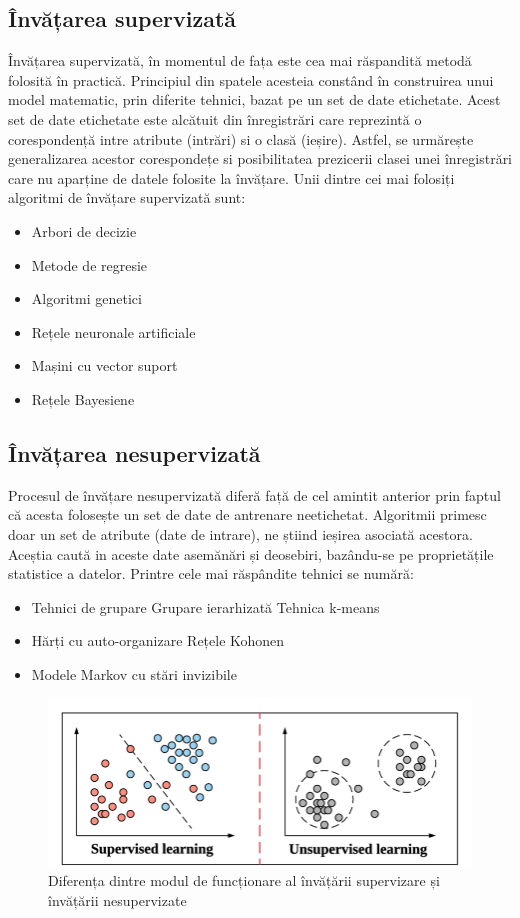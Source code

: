 \subsection*{Învățarea supervizată}
Învățarea supervizată, în momentul de fața este cea mai răspandită metodă folosită în practică. Principiul din spatele acesteia constând în construirea unui model matematic, prin diferite tehnici, bazat pe un set de date etichetate. Acest set de date etichetate este alcătuit din înregistrări care reprezintă o corespondență intre atribute (intrări) si o clasă (ieșire). Astfel, se urmărește generalizarea acestor corespondețe si posibilitatea prezicerii clasei unei înregistrări care nu aparține de datele folosite la învățare. Unii dintre cei mai folosiți algoritmi de învățare supervizată sunt:
\begin{itemize}
	\item Arbori de decizie
	\item Metode de regresie
	\item Algoritmi genetici
	\item Rețele neuronale artificiale
	\item Mașini cu vector suport
	\item Rețele Bayesiene
\end{itemize}

\subsection*{Învățarea nesupervizată}
Procesul de învățare nesupervizată diferă față de cel amintit anterior prin faptul că acesta folosește un set de date de antrenare neetichetat. Algoritmii primesc doar un set de atribute (date de intrare), ne știind ieșirea asociată acestora. Aceștia caută in aceste date asemănări și deosebiri, bazându-se pe proprietățile statistice a datelor. Printre cele mai răspândite tehnici se numără:
\begin{itemize}
	\item Tehnici de grupare
	\subitem Grupare ierarhizată
	\subitem Tehnica k-means
	\item Hărți cu auto-organizare
	\subitem Rețele Kohonen
	\item Modele Markov cu stări invizibile
\end{itemize}
\begin{figure}[h]
	\center
	\includegraphics[width=12cm, keepaspectratio]{fig/cap1/Examples-of-Supervised-Learning-Linear-Regression-and-Unsupervised-Learning.png}
	\caption{Diferența dintre modul de funcționare al învățării supervizare și învățării nesupervizate \cite{fig:sup_and_unsup}}
	\label{fig:sup_and_unsup_learning}
\end{figure}

